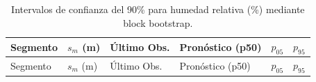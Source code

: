 \documentclass[
  spanish,
  us-letterpaper,
]{scrreprt}
\numberwithin{equation}{section}
\begin{document}
\begin{longtable}[]{@{}
  >{\raggedright\arraybackslash}p{}
  >{\raggedright\arraybackslash}p{}
  >{\raggedright\arraybackslash}p{}
  >{\raggedright\arraybackslash}p{}
  >{\raggedright\arraybackslash}p{}
  >{\raggedright\arraybackslash}p{}@{}}
\caption{Intervalos de confianza del 90\% para humedad relativa (\%)
mediante block bootstrap.}\label{tbl-incertidumbre-hum}\tabularnewline
\toprule\noalign{}
\begin{minipage}[b]{\linewidth}\raggedright
Segmento
\end{minipage} & \begin{minipage}[b]{\linewidth}\raggedright
\(s_m\) (m)
\end{minipage} & \begin{minipage}[b]{\linewidth}\raggedright
Último Obs.
\end{minipage} & \begin{minipage}[b]{\linewidth}\raggedright
Pronóstico (p50)
\end{minipage} & \begin{minipage}[b]{\linewidth}\raggedright
\(p_{05}\)
\end{minipage} & \begin{minipage}[b]{\linewidth}\raggedright
\(p_{95}\)
\end{minipage} \\
\midrule\noalign{}
\endfirsthead
\toprule\noalign{}
\begin{minipage}[b]{\linewidth}\raggedright
Segmento
\end{minipage} & \begin{minipage}[b]{\linewidth}\raggedright
\(s_m\) (m)
\end{minipage} & \begin{minipage}[b]{\linewidth}\raggedright
Último Obs.
\end{minipage} & \begin{minipage}[b]{\linewidth}\raggedright
Pronóstico (p50)
\end{minipage} & \begin{minipage}[b]{\linewidth}\raggedright
\(p_{05}\)
\end{minipage} & \begin{minipage}[b]{\linewidth}\raggedright
\(p_{95}\)
\end{minipage} \\

\end{longtable}
\end{document}

